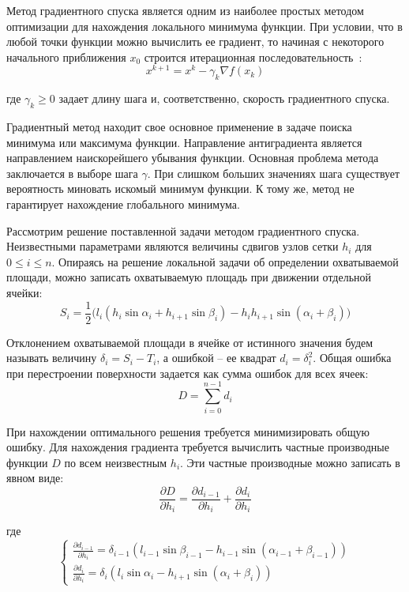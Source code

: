 Метод градиентного спуска является одним из наиболее простых методом оптимизации для нахождения локального минимума функции.
При условии, что в любой точки функции можно вычислить ее градиент, то начиная с некоторого начального приближения $x_0$ строится итерационная последовательность~\cite{Kantorovich1984Func}:
\begin{equation}
x^{k+1} = x^k - \gamma_k \nabla f(x_k)
\end{equation}

где $\gamma_k \ge 0$ задает длину шага и, соответственно, скорость градиентного спуска.

Градиентный метод находит свое основное применение в задаче поиска минимума или максимума функции.
Направление антиградиента является направлением наискорейшего убывания функции.
Основная проблема метода заключается в выборе шага $\gamma$.
При слишком больших значениях шага существует вероятность миновать искомый минимум функции.
К тому же, метод не гарантирует нахождение глобального минимума.

Рассмотрим решение поставленной задачи методом градиентного спуска.
Неизвестными параметрами являются величины сдвигов узлов сетки $h_i$ для $0 \le i \le n$.
Опираясь на решение локальной задачи об определении охватываемой площади, можно записать охватываемую площадь при движении отдельной ячейки:
\begin{equation}
S_i = \frac{1}{2}\big(l_i(h_i \sin \alpha_i + h_{i + 1} \sin \beta_i) - h_ih_{i + 1} \sin(\alpha_i + \beta_i)\big) 
\end{equation}

Отклонением охватываемой площади в ячейке от истинного значения будем называть величину $\delta_i = S_i - T_i$, а ошибкой -- ее квадрат $d_i = \delta_i^2$.
Общая ошибка при перестроении поверхности задается как сумма ошибок для всех ячеек:
\begin{equation}
D = \sum_{i = 0}^{n - 1}{d_i}
\end{equation}

При нахождении оптимального решения требуется минимизировать общую ошибку.
Для нахождения градиента требуется вычислить частные производные функции $D$ по всем неизвестным $h_i$.
Эти частные производные можно записать в явном виде:
\begin{equation}
\frac{\partial D}{\partial h_i} = \frac{\partial d_{i - 1}}{\partial h_i} + \frac{\partial d_i}{\partial h_i}
\end{equation}

где
\begin{equation}
\begin{cases}
\frac{\partial d_{i - 1}}{\partial h_i} = \delta_{i - 1}(l_{i - 1} \sin \beta_{i - 1} - h_{i - 1} \sin(\alpha_{i - 1} + \beta_{i - 1})) \\
\frac{\partial d_i}{\partial h_i} = \delta_i(l_i \sin \alpha_i - h_{i + 1} \sin(\alpha_i + \beta_i))
\end{cases}
\end{equation}


